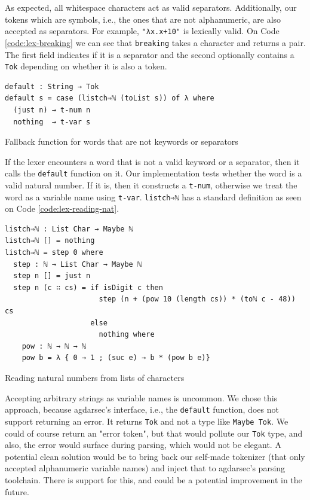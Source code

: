 As expected, all whitespace characters act as valid separators. Additionally, our tokens which are symbols, i.e., the ones that are not alphanumeric, are also accepted as separators. For example, \verb$"λx.x+10"$ is lexically valid. On Code \ref{code:lex-breaking} we can see that \verb$breaking$ takes a character and returns a pair. The first field indicates if it is a separator and the second optionally contains a \verb$Tok$ depending on whether it is also a token.

\begin{listing}[H]
\begin{verbatim}
default : String → Tok
default s = case (listch⇒ℕ (toList s)) of λ where
  (just n) → t-num n
  nothing  → t-var s
\end{verbatim}
\caption{Fallback function for words that are not keywords or separators}
\label{code:lex-default}
\end{listing}

If the lexer encounters a word that is not a valid keyword or a separator, then it calls the \verb$default$ function on it. Our implementation tests whether the word is a valid natural number. If it is, then it constructs a \verb$t-num$, otherwise we treat the word as a variable name using \verb$t-var$. \verb$listch⇒ℕ$ has a standard definition as seen on Code \ref{code:lex-reading-nat}.

\begin{listing}[H]
\begin{verbatim}
listch⇒ℕ : List Char → Maybe ℕ
listch⇒ℕ [] = nothing
listch⇒ℕ = step 0 where
  step : ℕ → List Char → Maybe ℕ
  step n [] = just n
  step n (c ∷ cs) = if isDigit c then
                      step (n + (pow 10 (length cs)) * (toℕ c - 48)) cs
                    else
                      nothing where
    pow : ℕ → ℕ → ℕ
    pow b = λ { 0 → 1 ; (suc e) → b * (pow b e)}
\end{verbatim}
\caption{Reading natural numbers from lists of characters}
\label{code:lex-reading-nat}
\end{listing}

Accepting arbitrary strings as variable names is uncommon. We chose this approach, because agdarsec's interface, i.e., the \verb$default$ function, does not support returning an error. It returns \verb$Tok$ and not a type like \verb$Maybe Tok$. We could of course return an "error token", but that would pollute our \verb$Tok$ type, and also, the error would surface during parsing, which would not be elegant. A potential clean solution would be to bring back our self-made tokenizer (that only accepted alphanumeric variable names) and inject that to agdarsec's parsing toolchain. There is support for this, and could be a potential improvement in the future.

